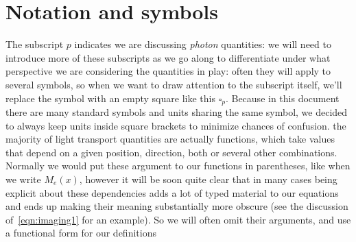 
\chapter{Notation and symbols}\label{ch:notation}

The subscript $p$ indicates we are discussing \textsl{photon} quantities: 
we will need to introduce more of these subscripts as we go along to differentiate under 
what perspective we are considering the quantities in play: often they will apply to
several symbols, so when we want to draw attention to the subscript itself, we'll replace
the symbol with an empty square like this $\square_p$.
Because in this document there are many standard symbols and units sharing the
same symbol, we decided to always keep units inside square brackets to minimize chances of 
confusion.
the majority of light transport quantities are actually functions, which take values
that depend on a given position, direction, both or several other combinations.
Normally we would put these argument to our functions in parentheses, like when we
write $M_e(x)$, however it will be soon quite clear that in many cases being explicit
about these dependencies adds a lot of typed material to our equations and ends up making their
meaning substantially more obscure (see the discussion of~\cref{eqn:imaging1} for an example).
So we will often omit their arguments, and use a functional form for our definitions

